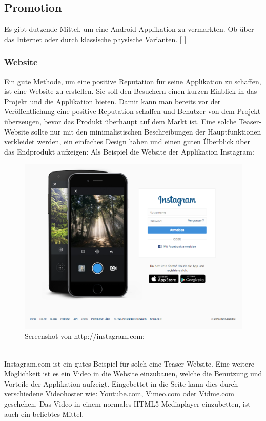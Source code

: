 \documentclass[FIPLY_base.tex]{subfiles}
\begin{document}
\subsection{Promotion}
Es gibt dutzende Mittel, um eine Android Applikation zu vermarkten. Ob über das Internet oder durch klassische physische Varianten.
[ \cite{promteil1}]

\subsubsection{Website}
Ein gute Methode, um eine positive Reputation für seine Applikation zu schaffen, ist eine Website zu erstellen. Sie soll den Besuchern einen kurzen Einblick in das Projekt und die Applikation bieten. Damit kann man bereits vor der Veröffentlichung eine positive Reputation schaffen und Benutzer von dem Projekt überzeugen, bevor das Produkt überhaupt auf dem Markt ist. Eine solche Teaser-Website sollte nur mit den minimalistischen Beschreibungen der Hauptfunktionen verkleidet werden, ein einfaches Design haben und einen guten Überblick über das Endprodukt aufzeigen: Als Beispiel die Website der Applikation Instagram:

\begin{figure}[H]
	\centering
	\includegraphics[scale=0.3]{img/instagramdotcom}
	\caption{Screenshot von http://instagram.com:}
\end{figure}
\ \\
Instagram.com ist ein gutes Beispiel für solch eine Teaser-Website. 
Eine weitere Möglichkeit ist es ein Video in die Website einzubauen, welche die Benutzung und Vorteile der Applikation aufzeigt. Eingebettet in die Seite kann dies durch verschiedene Videohoster wie: Youtube.com, Vimeo.com oder Vidme.com geschehen. Das Video in einem normales HTML5 Mediaplayer einzubetten, ist auch ein beliebtes Mittel.
\end{document}

